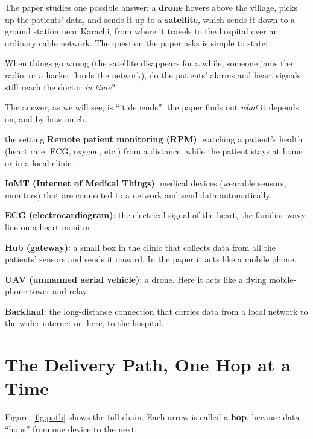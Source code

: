 \documentclass[11pt,a4paper]{article}
\newcommand{\kt}[1]{\textbf{\color{navy}#1}}
\begin{document}
The paper studies one possible answer: a \kt{drone} hovers above the village, picks up the patients' data, and sends it up to a \kt{satellite}, which sends it down to a ground station near Karachi, from where it travels to the hospital over an ordinary cable network. The question the paper asks is simple to state:

\begin{center}
\begin{tcolorbox}[colback=white,colframe=navy,width=0.86\linewidth,arc=2pt,boxrule=0.8pt,halign=center]
\sffamily When things go wrong (the satellite disappears for a while, someone jams the radio, or a hacker floods the network), do the patients' alarms and heart signals still reach the doctor \emph{in time}?
\end{tcolorbox}
\end{center}

The answer, as we will see, is ``it depends'': the paper finds out \emph{what} it depends on, and by how much.

\begin{term}{the setting}
\kt{Remote patient monitoring (RPM)}: watching a patient's health (heart rate, ECG, oxygen, etc.) from a distance, while the patient stays at home or in a local clinic.\par
\kt{IoMT (Internet of Medical Things)}: medical devices (wearable sensors, monitors) that are connected to a network and send data automatically.\par
\kt{ECG (electrocardiogram)}: the electrical signal of the heart, the familiar wavy line on a heart monitor.\par
\kt{Hub (gateway)}: a small box in the clinic that collects data from all the patients' sensors and sends it onward. In the paper it acts like a mobile phone.\par
\kt{UAV (unmanned aerial vehicle)}: a drone. Here it acts like a flying mobile-phone tower and relay.\par
\kt{Backhaul}: the long-distance connection that carries data from a local network to the wider internet or, here, to the hospital.
\end{term}

\section{The Delivery Path, One Hop at a Time}

Figure~\ref{fig:path} shows the full chain. Each arrow is called a \kt{hop}, because data ``hops'' from one device to the next.
\end{document}
